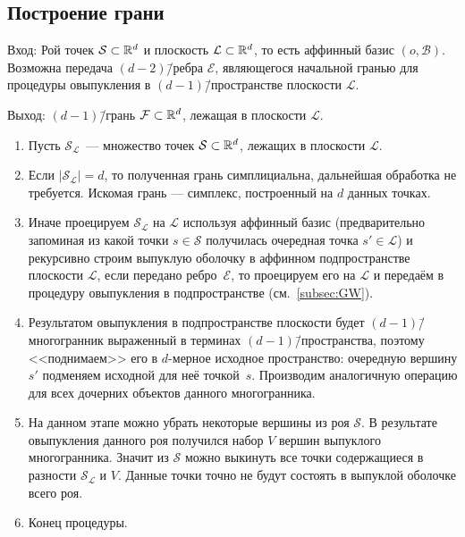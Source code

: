 \documentclass[a4paper,12pt]{article}
\newcommand{\R}[1][]{%
  \ifthenelse{\equal{#1}{}}%
  {\mathbb{R}}%
  {\mathbb{R}^{#1}}}
\newcommand{\Swarm}{\mathcal{S}}              %
\newcommand{\Facet}{\mathcal{F}}              %
\newcommand{\Edge}{\mathcal{E}}               %
\newcommand{\Basis}{\mathcal{B}}              %
\newcommand{\Plane}{\mathcal{L}}           %
\renewcommand{\.}{\hspace{0.2ex}}
\begin{document}
  \subsection{Построение грани}
    \label{FacetConstruction}

    Вход: Рой точек $\Swarm \subset \R[d]$ и плоскость $\Plane \subset \R[d]$, то есть аффинный базис $(o, \Basis)$. Возможна передача $(d-2)$\=/ребра $\Edge$, являющегося начальной гранью для процедуры овыпукления в $(d-1)$\=/пространстве плоскости $\Plane$.

    Выход: $(d-1)$\=/грань $\Facet \subset \R[d]$, лежащая в плоскости $\Plane$.

    \begin{enumerate}
      \item Пусть $\Swarm_\Plane$~--- множество точек $\Swarm \subset \R[d]$, лежащих в плоскости $\Plane$.


      \item Если $|\Swarm_\Plane| = d$, то полученная грань симплициальна, дальнейшая обработка не требуется. Искомая грань --- симплекс, построенный на $d$ данных точках.


      \item Иначе проецируем $\Swarm_\Plane$ на $\Plane$ используя аффинный базис (предварительно запоминая из какой точки $s \in \Swarm$ получилась очередная точка $s' \in \Plane$) и рекурсивно строим выпуклую оболочку в аффинном подпространстве плоскости $\Plane$, если передано ребро~$\Edge$, то проецируем его на $\Plane$ и передаём в процедуру овыпукления в подпространстве (см.~\ref{subsec:GW}).


      \item Результатом овыпукления в подпространстве плоскости будет $(d-1)$\=/многогранник выраженный в терминах $(d-1)$\=/пространства, поэтому <<поднимаем>> его в $d$-мерное исходное пространство: очередную вершину $s'$ подменяем исходной для неё точкой~$s$. Производим аналогичную операцию для всех дочерних объектов данного многогранника.


      \item На данном этапе можно убрать некоторые вершины из роя $\Swarm$. В результате овыпукления данного роя получился набор $V$ вершин выпуклого многогранника. Значит из $\Swarm$ можно выкинуть все точки содержащиеся в разности $\Swarm_\Plane$ и $V$. Данные точки точно не будут состоять в выпуклой оболочке всего роя.


      \item Конец процедуры.
    \end{enumerate}
\end{document}
